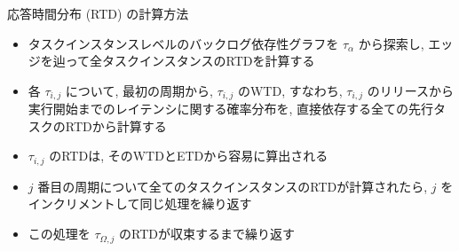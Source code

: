 \begin{frame}{応答時間分布 (RTD) の計算方法}
    \begin{itemize}
        \item タスクインスタンスレベルのバックログ依存性グラフを $\tau_{\alpha}$ から探索し, エッジを辿って全タスクインスタンスのRTDを計算する
        \item 各 $\tau_{i, j}$ について, 最初の周期から, $\tau_{i, j}$ のWTD, すなわち, $\tau_{i, j}$ のリリースから実行開始までのレイテンシに関する確率分布を, 直接依存する全ての先行タスクのRTDから計算する
        \item $\tau_{i, j}$ のRTDは, そのWTDとETDから容易に算出される
        \item $j$ 番目の周期について全てのタスクインスタンスのRTDが計算されたら, $j$ をインクリメントして同じ処理を繰り返す
        \item この処理を $\tau_{\Omega, j}$ のRTDが収束するまで繰り返す
    \end{itemize}
\end{frame}



